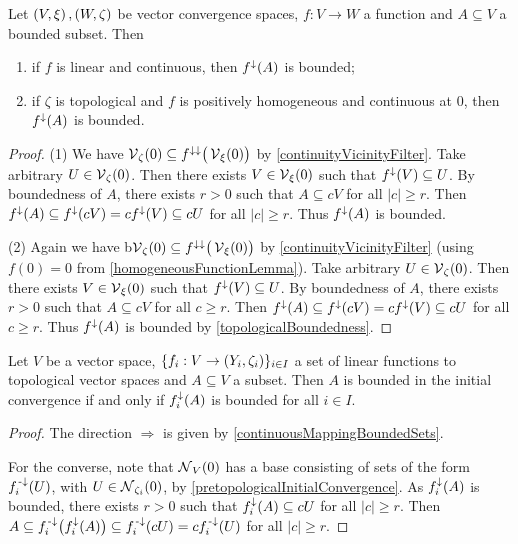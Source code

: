 \begin{proposition} \label{continuousMappingBoundedSets}
Let $\left( V,\xi \right), \left( W,\zeta \right)$ be vector convergence spaces, $f:V\to W$ a function and $A\subseteq V$ a bounded subset. Then
\begin{enumerate}
\item if $f$ is linear and continuous, then $f^\downarrow(A)$ is bounded;
\item if $\zeta$ is topological and $f$ is positively homogeneous and continuous at $0$, then $f^\downarrow(A)$ is bounded.
\end{enumerate} 
\end{proposition}
\begin{proof}
(1) We have $\operatorname{\mathcal{V}}_\zeta(0) \subseteq f^{\downarrow\downarrow}\big(\operatorname{\mathcal{V}}_\xi(0)\big)$ by \ref{continuityVicinityFilter}.
Take arbitrary $U\in \operatorname{\mathcal{V}}_\zeta(0)$. Then there exists $V\in \operatorname{\mathcal{V}}_\xi(0)$ such that $f^\downarrow(V) \subseteq U$. By boundedness of $A$, there exists $r>0$ such that $A \subseteq cV$ for all $|c|\geq r$. Then $f^\downarrow(A)\subseteq f^\downarrow(cV) = cf^\downarrow(V) \subseteq cU$ for all $|c|\geq r$. Thus $f^\downarrow(A)$ is bounded.

(2) Again we have b$\operatorname{\mathcal{V}}_\zeta(0) \subseteq f^{\downarrow\downarrow}\big(\operatorname{\mathcal{V}}_\xi(0)\big)$ by \ref{continuityVicinityFilter} (using $f(0) = 0$ from \ref{homogeneousFunctionLemma}). Take arbitrary $U\in \operatorname{\mathcal{V}}_\zeta(0)$. Then there exists $V\in \operatorname{\mathcal{V}}_\xi(0)$ such that $f^\downarrow(V) \subseteq U$. By boundedness of $A$, there exists $r>0$ such that $A \subseteq cV$ for all $c\geq r$. Then $f^\downarrow(A)\subseteq f^\downarrow(cV) = cf^\downarrow(V) \subseteq cU$ for all $c\geq r$. Thus $f^\downarrow(A)$ is bounded by \ref{topologicalBoundedness}.
\end{proof}

\begin{proposition} \label{boundedSetsInitialTopology}
Let $V$ be a vector space, $\{f_i:V\to \left( Y_i,\zeta_i \right)\}_{i\in I}$ a set of linear functions to topological vector spaces and $A\subseteq V$ a subset. Then $A$ is bounded in the initial convergence \textup{if and only if} $f_{i}^{\downarrow}(A)$ is bounded for all $i\in I$.
\end{proposition}
\begin{proof}
The direction $\Rightarrow$ is given by \ref{continuousMappingBoundedSets}.

For the converse, note that $\operatorname{\mathcal{N}}_V(0)$ has a base consisting of sets of the form $f^{{\text{\hspace{0.15em}-}\downarrow}}_i(U)$, with $U\in \operatorname{\mathcal{N}}_{\zeta_i}(0)$, by \ref{pretopologicalInitialConvergence}.
As $f_{i}^{\downarrow}(A)$ is bounded, there exists $r>0$ such that $f_{i}^{\downarrow}(A) \subseteq cU$ for all $|c|\geq r$. Then $A \subseteq f_i^{{\text{\hspace{0.15em}-}\downarrow}}\big(f_i^\downarrow(A)\big) \subseteq f_i^{\text{\hspace{0.15em}-}\downarrow}(cU) = cf_i^{\text{\hspace{0.15em}-}\downarrow}(U)$ for all $|c|\geq r$.
\end{proof}

